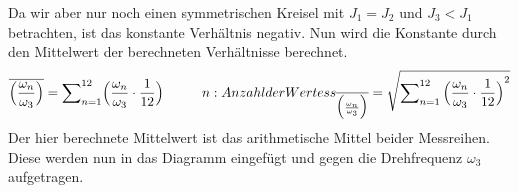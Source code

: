 Da wir aber nur noch einen symmetrischen Kreisel mit $J_1 = J_2$ und $J_3<J_1$ betrachten, ist das konstante Verh\"altnis  negativ. Nun wird die Konstante durch den Mittelwert der berechneten Verh\"altnisse berechnet.
\begin{equation}
    \overline{\Bigl(\frac{\omega_n}{\omega_3}\Bigr)} = \sum\nolimits_{n=1}^{12}\Bigl(\frac{\omega_n}{\omega_3}\cdot{\frac{1}{12}}\Bigr) \tab n: Anzahl der Wertes \\
    s_{\overline{\Bigl(\frac{\omega_n}{\omega_3}\Bigr)}} = \sqrt{\sum\nolimits_{n=1}^{12}{\Bigl(\frac{\omega_n}{\omega_3}\cdot{\frac{1}{12}\Bigr)}^2}}
\end{equation}
Der hier berechnete Mittelwert ist das arithmetische Mittel beider Messreihen. Diese werden nun in das Diagramm eingef\"ugt und gegen die Drehfrequenz $\omega_3$ aufgetragen. 